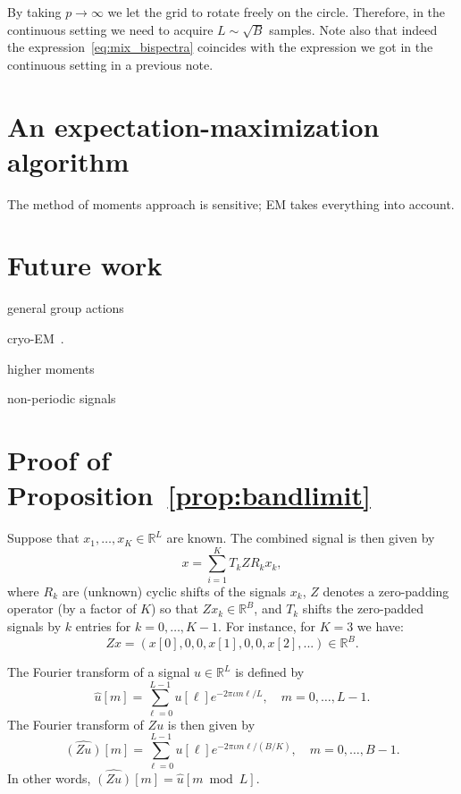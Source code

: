 \documentclass[english,12pt]{article}
\newcommand{\I}{\iota}
\newcommand{\R}{\mathbb{R}}
\numberwithin{equation}{section}
\numberwithin{mytheorem}{section} %
\begin{document}
By taking $p\to\infty$ we let the grid to rotate freely on the circle. Therefore, in the continuous setting we need to acquire $L\sim\sqrt{B}$ samples. Note also that indeed the expression~\eqref{eq:mix_bispectra} coincides with the expression we got in the continuous setting in a previous note.

\section{An expectation-maximization algorithm}

The method of moments approach is sensitive; EM takes everything into account.

\section{Future work}
general group actions

cryo-EM~\cite{chen2018single}.

higher moments

non-periodic signals 

	
	




\appendix

\section{Proof of Proposition~\ref{prop:bandlimit}}
Suppose that $x_1,\ldots,x_K\in\R^L$ are known.
The combined signal is then given by 
\begin{equation}
x = \sum_{i=1}^K T_kZR_kx_k,
\end{equation}
where $R_k$ are (unknown) cyclic shifts of the signals $x_k$, $Z$ denotes a zero-padding operator (by a factor of $K$) so that $Zx_k\in\mathbb{R}^B$, and $T_k$ shifts the zero-padded signals by $k$ entries for $k=0,\ldots, K-1$. 
For instance, for $K=3$ we have: 
\begin{equation}
Zx = (x[0],0,0,x[1],0,0,x[2],...)\in\mathbb{R}^B.
\end{equation}

The Fourier transform of a signal $u\in\mathbb{R}^{L}$ is defined by 
\begin{equation}
\hat{u}[m]=\sum_{\ell=0}^{L-1}u[\ell]e^{-2\pi\I m\ell /L}, \quad m=0,\ldots,L-1. 
\end{equation}
The Fourier transform of $Zu$ is then given by 
\begin{equation}
\widehat{(Zu)}[m] = \sum_{\ell=0}^{L-1}u[\ell]e^{-2\pi\I m\ell /(B/K)}, \quad m=0,\ldots,B-1.
\end{equation}
In other words, $\widehat{(Zu)}[m] = \hat{u}[m\bmod L]$.
\end{document}
